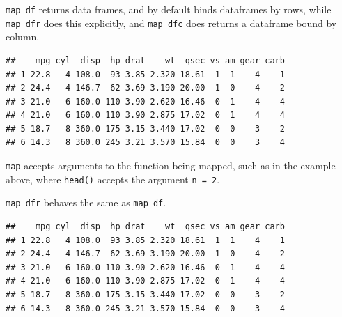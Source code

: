 \documentclass[]{book}
\newenvironment{Shaded}{}{}
\newcommand{\CommentTok}[1]{\textcolor[rgb]{0.38,0.63,0.69}{\textit{#1}}}
\newcommand{\DataTypeTok}[1]{\textcolor[rgb]{0.56,0.13,0.00}{#1}}
\newcommand{\DecValTok}[1]{\textcolor[rgb]{0.25,0.63,0.44}{#1}}
\newcommand{\KeywordTok}[1]{\textcolor[rgb]{0.00,0.44,0.13}{\textbf{#1}}}
\newcommand{\NormalTok}[1]{#1}
\newcommand{\OperatorTok}[1]{\textcolor[rgb]{0.40,0.40,0.40}{#1}}
\newcommand{\StringTok}[1]{\textcolor[rgb]{0.25,0.44,0.63}{#1}}
\begin{document}
\texttt{map\_df} returns data frames, and by default binds dataframes by rows, while \texttt{map\_dfr} does this explicitly, and \texttt{map\_dfc} does returns a dataframe bound by column.

\begin{Shaded}
\end{Shaded}

\begin{verbatim}
##    mpg cyl  disp  hp drat    wt  qsec vs am gear carb
## 1 22.8   4 108.0  93 3.85 2.320 18.61  1  1    4    1
## 2 24.4   4 146.7  62 3.69 3.190 20.00  1  0    4    2
## 3 21.0   6 160.0 110 3.90 2.620 16.46  0  1    4    4
## 4 21.0   6 160.0 110 3.90 2.875 17.02  0  1    4    4
## 5 18.7   8 360.0 175 3.15 3.440 17.02  0  0    3    2
## 6 14.3   8 360.0 245 3.21 3.570 15.84  0  0    3    4
\end{verbatim}

\texttt{map} accepts arguments to the function being mapped, such as in the example above, where \texttt{head()} accepts the argument \texttt{n\ =\ 2}.

\texttt{map\_dfr} behaves the same as \texttt{map\_df}.

\begin{Shaded}
\end{Shaded}

\begin{verbatim}
##    mpg cyl  disp  hp drat    wt  qsec vs am gear carb
## 1 22.8   4 108.0  93 3.85 2.320 18.61  1  1    4    1
## 2 24.4   4 146.7  62 3.69 3.190 20.00  1  0    4    2
## 3 21.0   6 160.0 110 3.90 2.620 16.46  0  1    4    4
## 4 21.0   6 160.0 110 3.90 2.875 17.02  0  1    4    4
## 5 18.7   8 360.0 175 3.15 3.440 17.02  0  0    3    2
## 6 14.3   8 360.0 245 3.21 3.570 15.84  0  0    3    4
\end{verbatim}
\end{document}
